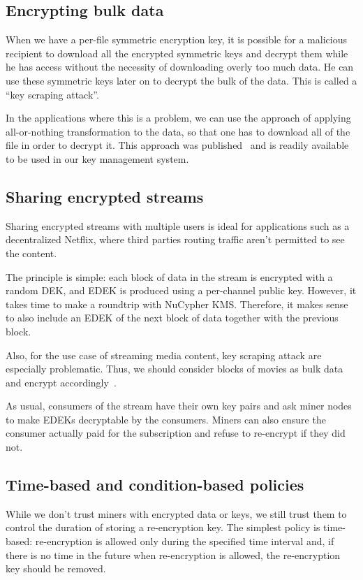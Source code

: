 \documentclass[longbibliography,nofootinbib]{revtex4-1}
\newcommand{\kms}{NuCypher KMS}
\begin{document}
\subsection{Encrypting bulk data}

When we have a per-file symmetric encryption key, it is possible for a malicious recipient to download all the encrypted symmetric keys and decrypt them
while he has access without the necessity of downloading overly too much data.
He can use these symmetric keys later on to decrypt the bulk of the data.
This is called a ``key scraping attack''.

In the applications where this is a problem, we can use the approach of applying all-or-nothing transformation to the data, so that one has to download all of the
file in order to decrypt it.
This approach was published~\cite{aont-bulk} and is readily available to be used in our key management system.

\subsection{Sharing encrypted streams}

Sharing encrypted streams with multiple users is ideal for applications such as a decentralized Netflix, where third parties routing traffic
aren't permitted to see the content.

The principle is simple: each block of data in the stream is encrypted with a random DEK, and EDEK is produced using a per-channel public key.
However, it takes time to make a roundtrip with \kms.
Therefore, it makes sense to also include an EDEK of the next block of data together with the previous block.

Also, for the use case of streaming media content, key scraping attack are especially problematic.
Thus, we should consider blocks of movies as bulk data and encrypt accordingly~\cite{aont-bulk}.

As usual, consumers of the stream have their own key pairs and ask miner nodes to make EDEKs decryptable by the consumers.
Miners can also ensure the consumer actually paid for the subscription and refuse to re-encrypt if they did not.

\subsection{Time-based and condition-based policies}

While we don't trust miners with encrypted data or keys, we still trust them to control the duration of storing a re-encryption key.
The simplest policy is time-based: re-encryption is allowed only during the specified time interval and, if there is no time in the future when
re-encryption is allowed, the re-encryption key should be removed.
\end{document}
